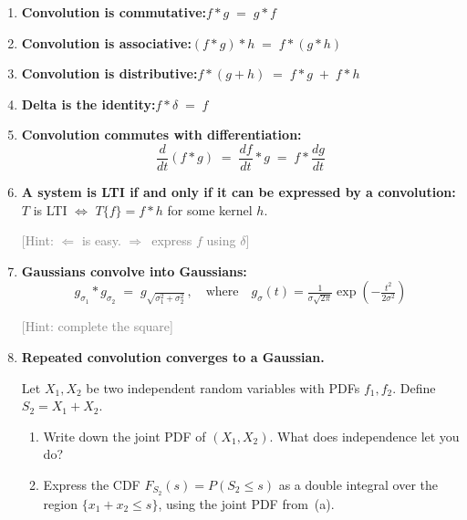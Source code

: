 \documentclass[11pt,a4paper]{article}
\DeclareMathOperator{\conv}{*}
\begin{document}
\begin{enumerate}[leftmargin=2em, itemsep=6pt]

  \item \textbf{Convolution is commutative:}\quad $f \conv g \;=\; g \conv f$

  \item \textbf{Convolution is associative:}\quad $(f \conv g) \conv h \;=\; f \conv (g \conv h)$

  \item \textbf{Convolution is distributive:}\quad $f \conv (g + h) \;=\; f \conv g \;+\; f \conv h$

  \item \textbf{Delta is the identity:}\quad $f \conv \delta \;=\; f$

  \item \textbf{Convolution commutes with differentiation:}
  \[\frac{d}{dt}(f \conv g) \;=\; \frac{df}{dt} \conv g \;=\; f \conv \frac{dg}{dt}\]

  \item \textbf{A system is LTI if and only if it can be expressed by a convolution:}\quad $T$ is LTI $\Leftrightarrow$ $T\{f\} = f \conv h$ for some kernel $h$.

  \textcolor{gray}{\small [Hint: $\Leftarrow$ is easy.\; $\Rightarrow$\, express $f$ using $\delta$]}

  \item \textbf{Gaussians convolve into Gaussians:}
  \[ g_{\sigma_1} \conv g_{\sigma_2} \;=\; g_{\sqrt{\sigma_1^2 + \sigma_2^2}} \,,\quad \text{where}\quad g_\sigma(t) = \tfrac{1}{\sigma\sqrt{2\pi}}\exp\!\left(-\tfrac{t^2}{2\sigma^2}\right) \]

  \textcolor{gray}{\small [Hint: complete the square]}

  \item \textbf{Repeated convolution converges to a Gaussian.}

  Let $X_1, X_2$ be two independent random variables with PDFs $f_1, f_2$.
  Define $S_2 = X_1 + X_2$.

  \begin{enumerate}[label=(\alph*), itemsep=4pt]

    \item Write down the joint PDF of $(X_1, X_2)$.
    What does independence let you do?

    \item Express the CDF $F_{S_2}(s) = P(S_2 \le s)$ as a double integral
    over the region $\{x_1 + x_2 \le s\}$, using the joint PDF from~(a).


\end{enumerate}
\end{enumerate}
\end{document}

